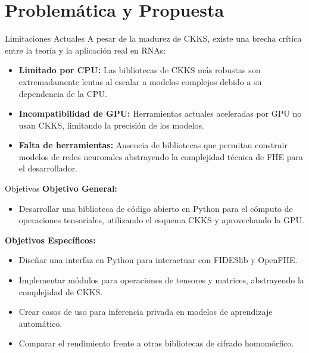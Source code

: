 \section{Problemática y Propuesta}

\begin{frame}{Limitaciones Actuales}
    A pesar de la madurez de CKKS, existe una brecha crítica entre la teoría y la aplicación real en RNAs:
    \vspace{0.3cm}
    \begin{itemize}
        \setlength{\itemsep}{12pt}
        \item \textbf{Limitado por CPU:} Las bibliotecas de CKKS más robustas son extremadamente lentas al escalar a modelos complejos debido a su dependencia de la CPU.
        \item \textbf{Incompatibilidad de GPU:} Herramientas actuales aceleradas por GPU no usan CKKS, limitando la precisión de los modelos.
        \item \textbf{Falta de herramientas:} Ausencia de bibliotecas que permitan construir modelos de redes neuronales abstrayendo la complejidad técnica de FHE para el desarrollador.
    \end{itemize}
\end{frame}

\begin{frame}{Objetivos}
    \textbf{Objetivo General:}
    \begin{itemize}
        \item Desarrollar una biblioteca de código abierto en Python para el cómputo de operaciones tensoriales, utilizando el esquema CKKS y aprovechando la GPU.
    \end{itemize}
    \vspace{0.2cm}
    \textbf{Objetivos Específicos:}
    \begin{itemize}
        \item Diseñar una interfaz en Python para interactuar con FIDESlib y OpenFHE.
        \item Implementar módulos para operaciones de tensores y matrices, abstrayendo la complejidad de CKKS.
        \item Crear casos de uso para inferencia privada en modelos de aprendizaje automático.
        \item Comparar el rendimiento frente a otras bibliotecas de cifrado homomórfico.
    \end{itemize}
\end{frame}

